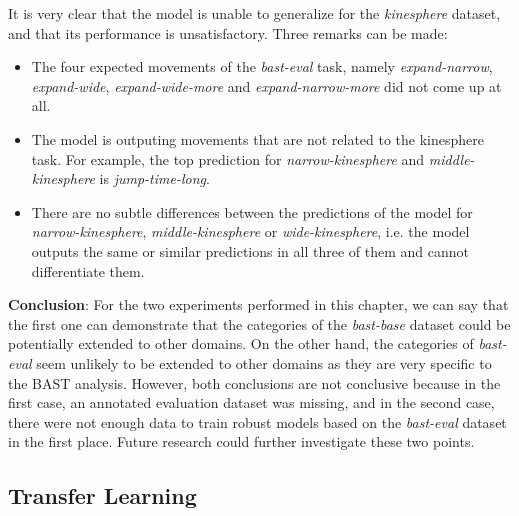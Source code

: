 \documentclass[extern,palatino]{cgMA}
\begin{document}
\noindent It is very clear that the model is unable to generalize for the \textit{kinesphere} dataset, and that its performance is unsatisfactory. Three remarks can be made:

\begin{itemize}
    \item The four expected movements of the \textit{bast-eval} task, namely \textit{expand-narrow}, \textit{expand-wide}, \textit{expand-wide-more} and \textit{expand-narrow-more} did not come up at all.
    \item The model is outputing movements that are not related to the kinesphere task. For example, the top prediction for \textit{narrow-kinesphere} and \textit{middle-kinesphere} is \textit{jump-time-long}.
    \item There are no subtle differences between the predictions of the model for \textit{narrow-kinesphere}, \textit{middle-kinesphere} or \textit{wide-kinesphere}, i.e. the model outputs the same or similar predictions in all three of them and cannot differentiate them.
\end{itemize}

\bigskip
\bigskip
\noindent\textbf{Conclusion}: For the two experiments performed in this chapter, we can say that the first one can demonstrate that the categories of the \textit{bast-base} dataset could be potentially extended to other domains. On the other hand, the categories of \textit{bast-eval} seem unlikely to be extended to other domains as they are very specific to the BAST analysis. However, both conclusions are not conclusive because in the first case, an annotated evaluation dataset was missing, and in the second case, there were not enough data to train robust models based on the \textit{bast-eval} dataset in the first place. Future research could further investigate these two points.

\newpage
\subsection{Transfer Learning}
\label{research_question_4}

\end{document}
